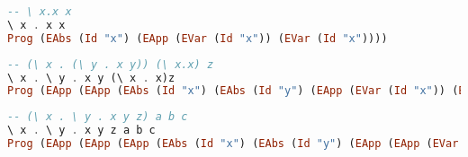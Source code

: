 \documentclass{article}
\theoremstyle{theorem}
\theoremstyle{definition}
\theoremstyle{remark}
\begin{document}
\hfil
{}
\hfil

\begin{lstlisting}[language=Haskell]
-- \ x.x x
\ x . x x
Prog (EAbs (Id "x") (EApp (EVar (Id "x")) (EVar (Id "x"))))
\end{lstlisting}

\hfil
{}
\hfil

\newpage
\begin{lstlisting}[language=Haskell]
-- (\ x . (\ y . x y)) (\ x.x) z
\ x . \ y . x y (\ x . x)z
Prog (EApp (EApp (EAbs (Id "x") (EAbs (Id "y") (EApp (EVar (Id "x")) (EVar (Id "y"))))) (EAbs (Id "x") (EVar (Id "x")))) (EVar (Id "z")))
\end{lstlisting}

\hfil
{}
\hfil

\newpage
\begin{lstlisting}[language=Haskell]
-- (\ x . \ y . x y z) a b c
\ x . \ y . x y z a b c
Prog (EApp (EApp (EApp (EAbs (Id "x") (EAbs (Id "y") (EApp (EApp (EVar (Id "x")) (EVar (Id "y"))) (EVar (Id "z"))))) (EVar (Id "a"))) (EVar (Id "b"))) (EVar (Id "c")))
\end{lstlisting}

\hfil
{}
\hfil
\end{document}
